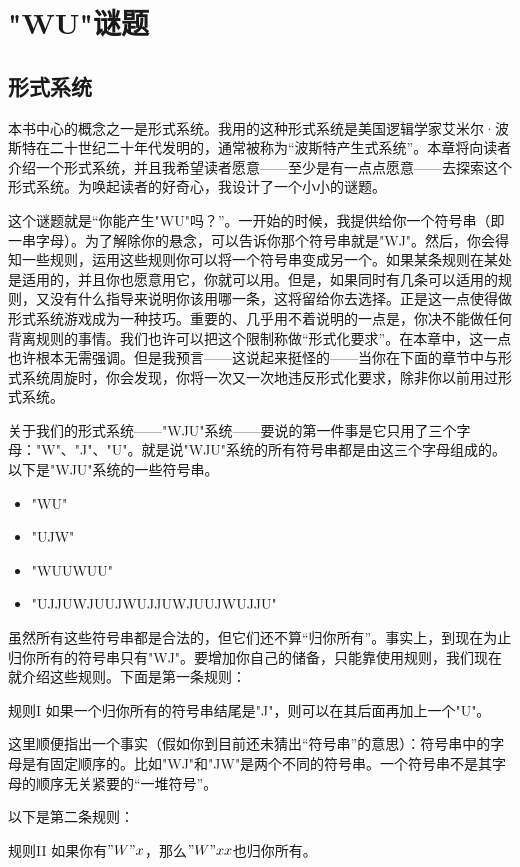 
\chapter{"WU"谜题}

\section{形式系统}

本书中心的概念之一是形式系统。我用的这种形式系统是美国逻辑学家艾米尔·波斯特在二十世纪二十年代发明的，通常被称为“波斯特产生式系统”。本章将向读者介绍一个形式系统，并且我希望读者愿意——至少是有一点点愿意——去探索这个形式系统。为唤起读者的好奇心，我设计了一个小小的谜题。

这个谜题就是“你能产生"WU"吗？”。一开始的时候，我提供给你一个符号串（即一串字母）。为了解除你的悬念，可以告诉你那个符号串就是"WJ"。然后，你会得知一些规则，运用这些规则你可以将一个符号串变成另一个。如果某条规则在某处是适用的，并且你也愿意用它，你就可以用。但是，如果同时有几条可以适用的规则，又没有什么指导来说明你该用哪一条，这将留给你去选择。正是这一点使得做形式系统游戏成为一种技巧。重要的、几乎用不着说明的一点是，你决不能做任何背离规则的事情。我们也许可以把这个限制称做“形式化要求”。在本章中，这一点也许根本无需强调。但是我预言——这说起来挺怪的——当你在下面的章节中与形式系统周旋时，你会发现，你将一次又一次地违反形式化要求，除非你以前用过形式系统。

关于我们的形式系统——"WJU"系统——要说的第一件事是它只用了三个字母："W"、"J"、"U"。就是说"WJU"系统的所有符号串都是由这三个字母组成的。以下是"WJU"系统的一些符号串。
\begin{itemize}
\item "WU"
\item "UJW"
\item "WUUWUU"
\item "UJJUWJUUJWUJJUWJUUJWUJJU"
\end{itemize}
虽然所有这些符号串都是合法的，但它们还不算“归你所有”。事实上，到现在为止归你所有的符号串只有"WJ"。要增加你自己的储备，只能靠使用规则，我们现在就介绍这些规则。下面是第一条规则：

\begin{thm}{规则I}
如果一个归你所有的符号串结尾是"J"，则可以在其后面再加上一个"U"。
\end{thm}

这里顺便指出一个事实（假如你到目前还未猜出“符号串”的意思）：符号串中的字母是有固定顺序的。比如"WJ"和"JW"是两个不同的符号串。一个符号串不是其字母的顺序无关紧要的“一堆符号”。

以下是第二条规则：
\begin{thm}{规则II}
如果你有$"W"x$，那么$"W"xx$也归你所有。
\end{thm}

